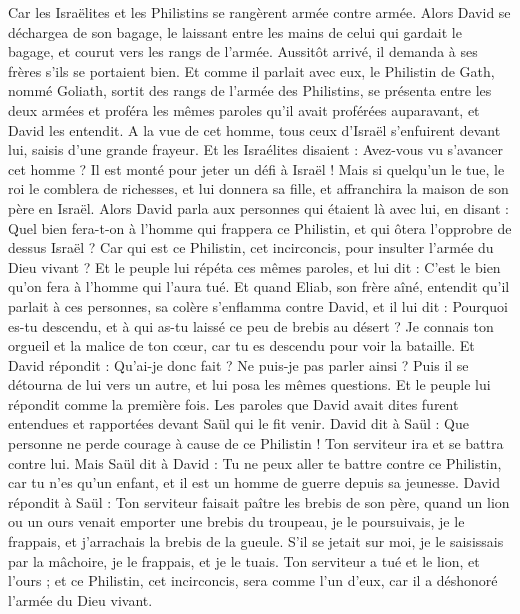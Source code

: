 \begin{multicols}{2}
Car les Israëlites et les Philistins se rangèrent armée contre armée.
Alors David se déchargea de son bagage, le laissant entre les mains de celui qui gardait le bagage, et courut vers les rangs de l’armée. Aussitôt arrivé, il demanda à ses frères s'ils se portaient bien.
Et comme il parlait avec eux, le Philistin de Gath, nommé Goliath, sortit des rangs de l'armée des Philistins, se présenta entre les deux armées et proféra les mêmes paroles qu'il avait proférées auparavant, et David les entendit.
A la vue de cet homme, tous ceux d'Israël s'enfuirent devant lui, saisis d’une grande frayeur.
Et les Israélites disaient : Avez-vous vu s’avancer cet homme ? Il est monté pour jeter un défi à Israël ! Mais si quelqu'un le tue, le roi le comblera de richesses, et lui donnera sa fille, et affranchira la maison de son père en Israël.
Alors David parla aux personnes qui étaient là avec lui, en disant : Quel bien fera-t-on à l'homme qui frappera ce Philistin, et qui ôtera l'opprobre de dessus Israël ? Car qui est ce Philistin, cet incirconcis, pour insulter l’armée du Dieu vivant ?
Et le peuple lui répéta ces mêmes paroles, et lui dit : C'est le bien qu'on fera à l'homme qui l'aura tué.
Et quand Eliab, son frère aîné, entendit qu'il parlait à ces personnes, sa colère s'enflamma contre David, et il lui dit : Pourquoi es-tu descendu, et à qui as-tu laissé ce peu de brebis au désert ? Je connais ton orgueil et la malice de ton cœur, car tu es descendu pour voir la bataille.
Et David répondit : Qu'ai-je donc fait ? Ne puis-je pas parler ainsi ?
Puis il se détourna de lui vers un autre, et lui posa les mêmes questions. Et le peuple lui répondit comme la première fois.
Les paroles que David avait dites furent entendues et rapportées devant Saül qui le fit venir.
David dit à Saül : Que personne ne perde courage à cause de ce Philistin ! Ton serviteur ira et se battra contre lui.
Mais Saül dit à David : Tu ne peux aller te battre contre ce Philistin, car tu n'es qu'un enfant, et il est un homme de guerre depuis sa jeunesse.
David répondit à Saül : Ton serviteur faisait paître les brebis de son père, quand un lion ou un ours venait emporter une brebis du troupeau,
je le poursuivais, je le frappais, et j’arrachais la brebis de la gueule. S’il se jetait sur moi, je le saisissais par la mâchoire, je le frappais, et je le tuais.
Ton serviteur a tué et le lion, et l’ours ; et ce Philistin, cet incirconcis, sera comme l'un d'eux, car il a déshonoré l’armée du Dieu vivant.

\end{multicols}
